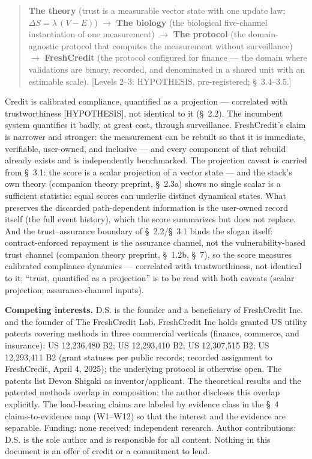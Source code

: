 \documentclass[11pt,twocolumn]{article}
\begin{document}
\begin{quote}
\textbf{The theory} (trust is a measurable vector state with one update law; $\Delta S = \lambda\,(V - E)$) $\rightarrow$ \textbf{The biology} (the biological five-channel instantiation of one measurement) $\rightarrow$ \textbf{The protocol} (the domain-agnostic protocol that computes the measurement without surveillance) $\rightarrow$ \textbf{FreshCredit} (the protocol configured for finance --- the domain where validations are binary, recorded, and denominated in a shared unit with an estimable scale). [Levels 2--3: HYPOTHESIS, pre-registered; \S~3.4--3.5.]
\end{quote}

Credit is calibrated compliance, quantified as a projection --- correlated with trustworthiness {[HYPOTHESIS]}, not identical to it (\S~2.2). The incumbent system quantifies it badly, at great cost, through surveillance. FreshCredit's claim is narrower and stronger: the measurement can be rebuilt so that it is immediate, verifiable, user-owned, and inclusive --- and every component of that rebuild already exists and is independently benchmarked. The projection caveat is carried from \S~3.1: the score is a scalar projection of a vector state --- and the stack's own theory (companion theory preprint, \S~2.3a) shows no single scalar is a sufficient statistic: equal scores can underlie distinct dynamical states. What preserves the discarded path-dependent information is the user-owned record itself (the full event history), which the score summarizes but does not replace. And the trust--assurance boundary of \S~2.2/\S~3.1 binds the slogan itself: contract-enforced repayment is the assurance channel, not the vulnerability-based trust channel (companion theory preprint, \S~1.2b, \S~7), so the score measures calibrated compliance dynamics --- correlated with trustworthiness, not identical to it; ``trust, quantified as a projection'' is to be read with both caveats (scalar projection; assurance-channel inputs).

\textbf{Competing interests.} D.S. is the founder and a beneficiary of FreshCredit Inc. and the founder of The FreshCredit Lab. FreshCredit Inc holds granted US utility patents covering methods in three commercial verticals (finance, commerce, and insurance): US 12,236,480 B2; US 12,293,410 B2; US 12,307,515 B2; US 12,293,411 B2 (grant statuses per public records; recorded assignment to FreshCredit, April 4, 2025); the underlying protocol is otherwise open. The patents list Devon Shigaki as inventor/applicant. The theoretical results and the patented methods overlap in composition; the author discloses this overlap explicitly. The load-bearing claims are labeled by evidence class in the \S~4 claims-to-evidence map (W1--W12) so that the interest and the evidence are separable. Funding: none received; independent research. Author contributions: D.S. is the sole author and is responsible for all content. Nothing in this document is an offer of credit or a commitment to lend.
\end{document}

